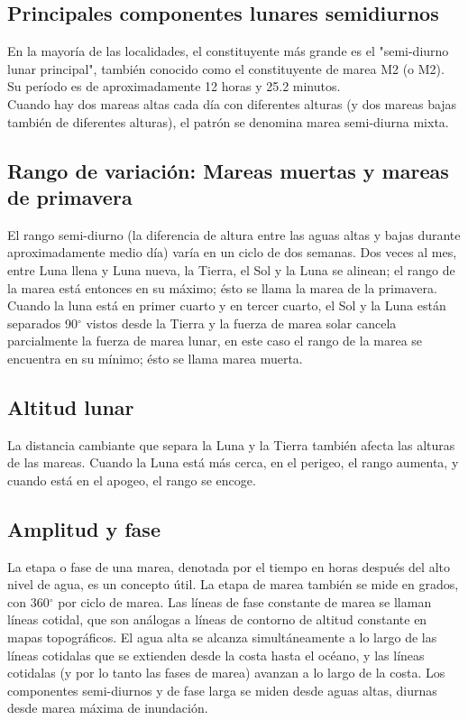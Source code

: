 \documentclass[12pt]{article}
\begin{document}
\begin{doublespace}
\subsection*{Principales componentes lunares semidiurnos}
En la mayoría de las localidades, el constituyente más grande es el "semi-diurno lunar principal", también conocido como el constituyente de marea M2 (o M2). Su período es de aproximadamente 12 horas y 25.2 minutos.\\

Cuando hay dos mareas altas cada día con diferentes alturas (y dos mareas bajas también de diferentes alturas), el patrón se denomina marea semi-diurna mixta.

\subsection*{Rango de variación: Mareas muertas y mareas de primavera}
El rango semi-diurno (la diferencia de altura entre las aguas altas y bajas durante aproximadamente medio día) varía en un ciclo de dos semanas. Dos veces al mes, entre Luna llena y Luna nueva, la Tierra, el Sol y la Luna se alinean; el rango de la marea está entonces en su máximo; ésto se llama la marea de la primavera.\\

Cuando la luna está en primer cuarto y en tercer cuarto, el Sol y la Luna están separados 90$^\circ$ vistos desde la Tierra y la fuerza de marea solar cancela parcialmente la fuerza de marea lunar, en este caso el rango de la marea se encuentra en su mínimo; ésto se llama marea muerta.

\subsection*{Altitud lunar}
La distancia cambiante que separa la Luna y la Tierra también afecta las alturas de las mareas. Cuando la Luna está más cerca, en el perigeo, el rango aumenta, y cuando está en el apogeo, el rango se encoge.

\subsection*{Amplitud y fase}
La etapa o fase de una marea, denotada por el tiempo en horas después del alto nivel de agua, es un concepto útil. La etapa de marea también se mide en grados, con 360$^\circ$ por ciclo de marea. Las líneas de fase constante de marea se llaman líneas cotidal, que son análogas a líneas de contorno de altitud constante en mapas topográficos. El agua alta se alcanza simultáneamente a lo largo de las líneas cotidalas que se extienden desde la costa hasta el océano, y las líneas cotidalas (y por lo tanto las fases de marea) avanzan a lo largo de la costa. Los componentes semi-diurnos y de fase larga se miden desde aguas altas, diurnas desde marea máxima de inundación. \\


\end{doublespace}
\end{document}
